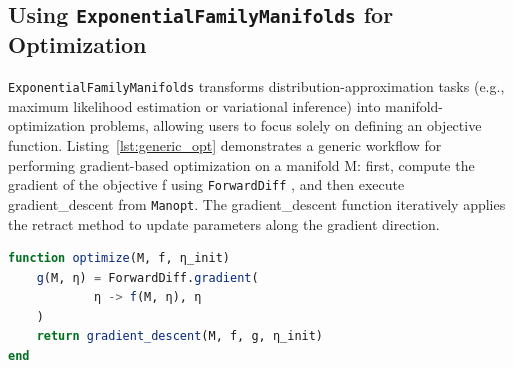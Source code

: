 \documentclass{juliacon}
\newcommand{\code}[1]{\textsf{#1}}
\begin{document}
\subsection{Using \texttt{ExponentialFamilyManifolds} for Optimization} \label{sec:using_efm}

\texttt{ExponentialFamilyManifolds} transforms distribution-approximation tasks 
(e.g., maximum likelihood estimation or variational inference) into manifold-optimization problems, 
allowing users to focus solely on defining an objective function. 
Listing~\ref{lst:generic_opt} demonstrates a generic workflow for performing gradient-based optimization on a manifold \code{M}: 
first, compute the gradient of the objective \code{f} using \texttt{ForwardDiff} \cite{revels_forward-mode_2016}, 
and then execute \code{gradient\_descent} from \texttt{Manopt}. 
The \code{gradient\_descent} function iteratively applies the \code{retract} method to update parameters along the gradient direction.
\begin{lstlisting}[language=Julia, caption={Generic manifold-based optimization}, label={lst:generic_opt}]
function optimize(M, f, η_init)
    g(M, η) = ForwardDiff.gradient(
            η -> f(M, η), η
    )
    return gradient_descent(M, f, g, η_init)
end
\end{lstlisting}
\vspace{1em}
\end{document}
